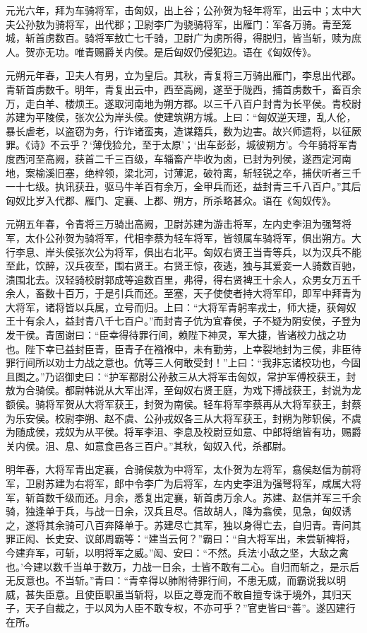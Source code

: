 \documentclass[12pt,UTF8]{ctexbook}
\begin{document}
元光六年，拜为车骑将军，击匈奴，出上谷；公孙贺为轻年将军，出云中；太中大夫公孙敖为骑将军，出代郡；卫尉李广为骁骑将军，出雁门：军各万骑。青至笼城，斩首虏数百。骑将军敖亡七千骑，卫尉广为虏所得，得脱归，皆当斩，赎为庶人。贺亦无功。唯青赐爵关内侯。是后匈奴仍侵犯边。语在《匈奴传》。



元朔元年春，卫夫人有男，立为皇后。其秋，青复将三万骑出雁门，李息出代郡。青斩首虏数千。明年，青复出云中，西至高阙，遂至于陇西，捕首虏数千，畜百余万，走白羊、楼烦王。遂取河南地为朔方郡。以三千八百户封青为长平侯。青校尉苏建为平陵侯，张次公为岸头侯。使建筑朔方城。上曰：“匈奴逆天理，乱人伦，暴长虐老，以盗窃为务，行诈诸蛮夷，造谋籍兵，数为边害。故兴师遗将，以征厥罪。《诗》不云乎？‘薄伐猃允，至于太原’；‘出车彭彭，城彼朔方’。今年骑将军青度西河至高阙，获首二千三百级，车辎畜产毕收为卤，已封为列侯，遂西定河南地，案榆溪旧塞，绝梓领，梁北河，讨薄泥，破符离，斩轻锐之卒，捕伏听者三千一十七级。执讯获丑，驱马牛羊百有余万，全甲兵而还，益封青三千八百户。”其后匈奴比岁入代郡、雁门、定襄、上郡、朔方，所杀略甚众。语在《匈奴传》。



元朔五年春，令青将三万骑出高阙，卫尉苏建为游击将军，左内史李沮为强弩将军，太仆公孙贺为骑将军，代相李蔡为轻车将军，皆领属车骑将军，俱出朔方。大行李息、岸头侯张次公为将军，俱出右北平。匈奴右贤王当青等兵，以为汉兵不能至此，饮醉，汉兵夜至，围右贤王。右贤王惊，夜逃，独与其爱妾一人骑数百驰，溃围北去。汉轻骑校尉郭成等追数百里，弗得，得右贤裨王十余人，众男女万五千余人，畜数十百万，于是引兵而还。至塞，天子使使者持大将军印，即军中拜青为大将军，诸将皆以兵属，立号而归。上曰：“大将军青躬率戎士，师大捷，获匈奴王十有余人，益封青八千七百户。”而封青子伉为宜春侯，子不疑为阴安侯，子登为发干侯。青固谢曰：“臣幸得待罪行间，赖陛下神灵，军大捷，皆诸校力战之功也。陛下幸已益封臣青，臣青子在襁褓中，未有勤劳，上幸裂地封为三侯，非臣待罪行间所以劝士力战之意也。伉等三人何敢受封！”上曰：“我非忘诸校功也，今固且图之。”乃诏御史曰：“护军都尉公孙敖三从大将军击匈奴，常护军傅校获王，封敖为合骑侯。都尉韩说从大军出浑，至匈奴右贤王庭，为戏下搏战获王，封说为龙额侯。骑将军贺从大将军获王，封贺为南侯。轻车将军李蔡再从大将军获王，封蔡为乐安侯。校尉李朔、赵不虞、公孙戎奴各三从大将军获王，封朔为陟轵侯，不虞为随成侯，戎奴为从平侯。将军李沮、李息及校尉豆如意、中郎将绾皆有功，赐爵关内侯。沮、息、如意食邑各三百户。”其秋，匈奴入代，杀都尉。



明年春，大将军青出定襄，合骑侯敖为中将军，太仆贺为左将军，翕侯赵信为前将军，卫尉苏建为右将军，郎中令李广为后将军，左内史李沮为强弩将军，咸属大将军，斩首数千级而还。月余，悉复出定襄，斩首虏万余人。苏建、赵信并军三千余骑，独逢单于兵，与战一日余，汉兵且尽。信故胡人，降为翕侯，见急，匈奴诱之，遂将其余骑可八百奔降单于。苏建尽亡其军，独以身得亡去，自归青。青问其罪正闳、长史安、议郎周霸等：“建当云何？”霸曰：“自大将军出，未尝斩裨将，今建弃军，可斩，以明将军之威。”闳、安曰：“不然。兵法‘小敌之坚，大敌之禽也。’今建以数千当单于数万，力战一日余，士皆不敢有二心。自归而斩之，是示后无反意也。不当斩。”青曰：“青幸得以肺附待罪行间，不患无威，而霸说我以明威，甚失臣意。且使臣职虽当斩将，以臣之尊宠而不敢自擅专诛于境外，其归天子，天子自裁之，于以风为人臣不敢专权，不亦可乎？”官吏皆曰“善”。遂囚建行在所。
\end{document}
